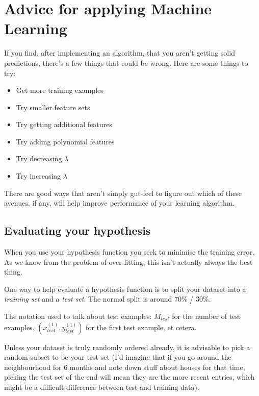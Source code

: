 
\chapter{Advice for applying Machine Learning}

If you find, after implementing an algorithm, that you aren't getting solid predictions, there's a few things that could be wrong. Here are some things to try:

\begin{itemize}
\item Get more training examples
\item Try smaller feature sets
\item Try getting additional features
\item Try adding polynomial features
\item Try decreasing $\lambda$
\item Try increasing $\lambda$
\end{itemize}

There are good ways that aren't simply gut-feel to figure out which of these avenues, if any, will help improve performance of your learning algorithm.

\section{Evaluating your hypothesis}

When you use your hypothesis function you seek to minimise the training error. As we know from the problem of over fitting, this isn't actually always the best thing.

One way to help evaluate a hypothesis function is to split your dataset into a \emph{training set} and a \emph{test set}. The normal split is around 70\% / 30\%.

The notation used to talk about test examples: $M_{test}$ for the number of test examples, $(x^{(1)}_{test}, y^{(1)}_{test})$ for the first test example, et cetera.

Unless your dataset is truly randomly ordered already, it is advisable to pick a random subset to be your test set (I'd imagine that if you go around the neighbourhood for 6 months and note down stuff about houses for that time, picking the test set of the end will mean they are the more recent entries, which might be a difficult difference between test and training data).

